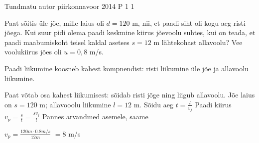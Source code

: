 {Tundmatu autor} %
{piirkonnavoor} %
{2014} %
{P 1} %
{1} %
{
\ifStatement
Paat sõitis üle jõe, mille laius oli $d = 120$ m, nii, et paadi siht oli kogu aeg risti jõega. Kui suur pidi olema paadi keskmine kiirus jõevoolu suhtes, kui on teada, et paadi maabumiskoht teisel kaldal asetses $s = 12$ m lähtekohast allavoolu? Vee voolukiirus jões oli $u = 0,8$ m/s.
\fi



\ifHint
Paadi liikumine koosneb kahest kompnendist: risti liikumine üle jõe ja allavoolu liikumine.
\fi

\ifSolution
Paat võtab osa kahest liikumisest: sõidab risti jõge ning liigub allavoolu. Jõe laius on $s = 120$ m; allavooolu liikumine $l = 12$ m.
\newline
Sõidu aeg $t = \frac{l}{v_j}$
\newline
Paadi kiirus $v_p = \frac {s}{t} = \frac {s v_j}{l}$
\newline
Pannes arvandmed asemele, saame
\begin{center}
$v_p = \frac{120 m \cdot 0.8 m/s}{12 m}$ $=8$ m/s
\end{center}
\fi
}